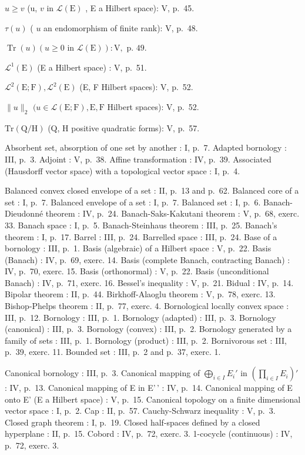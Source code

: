\(u \geqslant v\) (u, \(v\) in \(\mathcal{L}(\mathrm{E})\) , E a Hilbert space): V, p.~45.

\(\tau (u)\) ( \(u\) an endomorphism of finite rank): V, p.~48.

\(\operatorname{Tr}(u) (u \geqslant 0 \text{ in } \mathcal{L}(\mathrm{E})): \mathrm{V}, \text{ p. } 49.\)

\(\mathcal{L}^1 (\mathrm{E})\) (E a Hilbert space) : V, p.~51.

\(\mathcal{L}^2 (\mathrm{E};\mathrm{F}),\mathcal{L}^2 (\mathrm{E})\) (E, F Hilbert spaces): V, p.~52.

\(\| u\| _2\) \((u\in \mathcal{L}(\mathrm{E};\mathrm{F}),\mathrm{E},\mathrm{F}\) Hilbert spaces): V, p.~52.

\(\mathrm{Tr}(\mathrm{Q} / \mathrm{H})\) (Q, H positive quadratic forms): V, p.~57.


Absorbent set, absorption of one set by another : I, p.~7. Adapted bornology : III, p.~3. Adjoint : V, p.~38. Affine transformation : IV, p.~39. Associated (Hausdorff vector space) with a topological vector space : I, p.~4.

Balanced convex closed envelope of a set : II, p.~13 and p.~62. Balanced core of a set : I, p.~7. Balanced envelope of a set : I, p.~7. Balanced set : I, p.~6. Banach-Dieudonné theorem : IV, p.~24. Banach-Saks-Kakutani theorem : V, p.~68, exerc. 33. Banach space : I, p.~5. Banach-Steinhaus theorem : III, p.~25. Banach's theorem : I, p.~17. Barrel : III, p.~24. Barrelled space : III, p.~24. Base of a bornology : III, p.~1. Basis (algebraic) of a Hilbert space : V, p.~22. Basis (Banach) : IV, p.~69, exerc. 14. Basis (complete Banach, contracting Banach) : IV, p.~70, exerc. 15. Basis (orthonormal) : V, p.~22. Basis (unconditional Banach) : IV, p.~71, exerc. 16. Bessel's inequality : V, p.~21. Bidual : IV, p.~14. Bipolar theorem : II, p.~44. Birkhoff-Alaoglu theorem : V, p.~78, exerc. 13. Bishop-Phelps theorem : II, p.~77, exerc. 4. Bornological locally convex space : III, p.~12. Bornology : III, p.~1. Bornology (adapted) : III, p.~3. Bornology (canonical) : III, p.~3. Bornology (convex) : III, p.~2. Bornology generated by a family of sets : III, p.~1. Bornology (product) : III, p.~2. Bornivorous set : III, p.~39, exerc. 11. Bounded set : III, p.~2 and p.~37, exerc. 1.

Canonical bornology : III, p.~3. Canonical mapping of \(\bigoplus_{i\in I}E_i'\) in \(\left(\prod_{i\in I}E_i\right)'\) : IV, p.~13. Canonical mapping of E in E'\,' : IV, p.~14. Canonical mapping of E onto E' (E a Hilbert space) : V, p.~15. Canonical topology on a finite dimensional vector space : I, p.~2. Cap : II, p.~57. Cauchy-Schwarz inequality : V, p.~3. Closed graph theorem : I, p.~19. Closed half-spaces defined by a closed hyperplane : II, p.~15. Cobord : IV, p.~72, exerc. 3. 1-cocycle (continuous) : IV, p.~72, exerc. 3.

